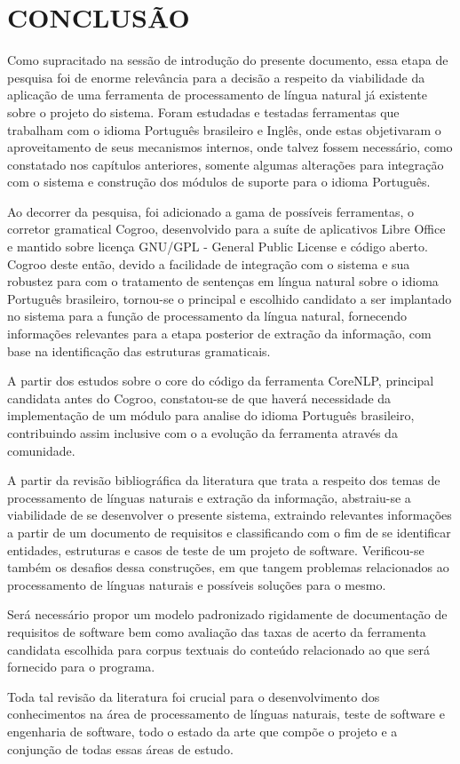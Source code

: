 \chapter{CONCLUSÃO}
\label{cap:conclusao}

Como supracitado na sessão de introdução do presente documento, essa etapa de pesquisa foi de enorme relevância para a decisão a respeito da viabilidade da aplicação de uma ferramenta de processamento de língua natural já existente sobre o projeto do sistema. Foram estudadas e testadas ferramentas que trabalham com o idioma Português brasileiro e Inglês, onde estas objetivaram o aproveitamento de seus mecanismos internos, onde talvez fossem necessário, como constatado nos capítulos anteriores, somente algumas alterações para integração com o sistema e construção dos módulos de suporte para o idioma Português.

Ao decorrer da pesquisa, foi adicionado a gama de possíveis ferramentas, o corretor gramatical Cogroo, desenvolvido para a suíte de aplicativos Libre Office e mantido sobre licença GNU/GPL - General Public License e código aberto. Cogroo deste então, devido a facilidade de integração com o sistema e sua robustez para com o tratamento de sentenças em língua natural sobre o idioma Português brasileiro, tornou-se o principal e escolhido candidato a ser implantado no sistema para a função de processamento da língua natural, fornecendo informações relevantes para a etapa posterior de extração da informação, com base na identificação das estruturas gramaticais.

A partir dos estudos sobre o core do código da ferramenta CoreNLP, principal candidata antes do Cogroo, constatou-se de que haverá necessidade da implementação de um módulo para analise do idioma Português brasileiro, contribuindo assim inclusive com o a evolução da ferramenta através da comunidade.

A partir da revisão bibliográfica da literatura que trata a respeito dos temas de processamento de línguas naturais e extração da informação, abstraiu-se a viabilidade de se desenvolver o presente sistema, extraindo relevantes informações a partir de um documento de requisitos e classificando com o fim de se identificar entidades, estruturas e casos de teste de um projeto de software. Verificou-se também os desafios dessa construções, em que tangem problemas relacionados ao processamento de línguas naturais e possíveis soluções para o mesmo.

Será necessário propor um modelo padronizado rigidamente de documentação de requisitos de software bem como avaliação das taxas de acerto da ferramenta candidata escolhida para corpus textuais do conteúdo relacionado ao que será fornecido para o programa.

Toda tal revisão da literatura foi crucial para o desenvolvimento dos conhecimentos na área de processamento de línguas naturais, teste de software e engenharia de software, todo o estado da arte que compõe o projeto e a conjunção de todas essas áreas de estudo.